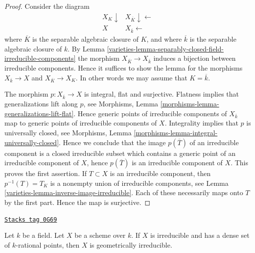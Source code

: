 \begin{proof}

Consider the diagram
$$
\begin{array}{cc}X_K \downarrow & X_{\overline{K}} \downarrow\longleftarrow \\ X & X_{\overline{k}} \longleftarrow\end{array}
$$
where $\overline{K}$ is the separable algebraic closure of $K$, and
where $\overline{k}$ is the separable algebraic closure of $k$. By
Lemma \ref{varieties-lemma-separably-closed-field-irreducible-components}
the morphism $X_{\overline{K}} \to X_{\overline{k}}$ induces
a bijection between irreducible components. Hence it suffices
to show the lemma for the morphisms
$X_{\overline{k}} \to X$ and $X_{\overline{K}} \to X_K$.
In other words we may assume that $K = \overline{k}$.

\medskip\noindent
The morphism $p : X_{\overline{k}} \to X$ is integral, flat and surjective.
Flatness implies that generalizations lift along $p$, see
Morphisms, Lemma \ref{morphisms-lemma-generalizations-lift-flat}.
Hence generic points of irreducible components of $X_{\overline{k}}$
map to generic points of irreducible components of $X$.
Integrality implies that $p$ is universally closed, see
Morphisms, Lemma \ref{morphisms-lemma-integral-universally-closed}.
Hence we conclude that the image $p(\overline{T})$ of an irreducible component
is a closed irreducible subset which contains a generic point of an
irreducible component of $X$, hence $p(\overline{T})$
is an irreducible component of $X$. This proves the first assertion.
If $T \subset X$ is an irreducible component, then $p^{-1}(T) =T_K$
is a nonempty union of irreducible components, see
Lemma \ref{varieties-lemma-inverse-image-irreducible}.
Each of these necessarily maps onto $T$ by the first part.
Hence the map is surjective.
\end{proof}

\begin{lemma}
\label{varieties-lemma-irreducible-dense-rational-points-geometrically-irreducible}
\href{https://stacks.math.columbia.edu/tag/0G69}{\texttt{Stacks tag 0G69}}

Let $k$ be a field. Let $X$ be a scheme over $k$. If $X$ is irreducible
and has a dense set of $k$-rational points, then $X$ is geometrically
irreducible.
\end{lemma}

